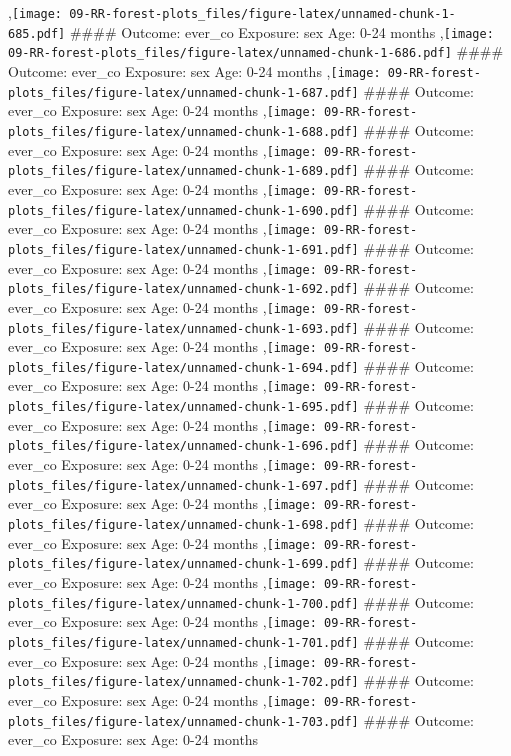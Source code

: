 \documentclass[
  9pt,
]{book}
\begin{document}
,\texttt{[image: 09-RR-forest-plots\_files/figure-latex/unnamed-chunk-1-685.pdf]}
\#\#\#\# Outcome: ever\_co Exposure: sex Age: 0-24 months
,\texttt{[image: 09-RR-forest-plots\_files/figure-latex/unnamed-chunk-1-686.pdf]}
\#\#\#\# Outcome: ever\_co Exposure: sex Age: 0-24 months
,\texttt{[image: 09-RR-forest-plots\_files/figure-latex/unnamed-chunk-1-687.pdf]}
\#\#\#\# Outcome: ever\_co Exposure: sex Age: 0-24 months
,\texttt{[image: 09-RR-forest-plots\_files/figure-latex/unnamed-chunk-1-688.pdf]}
\#\#\#\# Outcome: ever\_co Exposure: sex Age: 0-24 months
,\texttt{[image: 09-RR-forest-plots\_files/figure-latex/unnamed-chunk-1-689.pdf]}
\#\#\#\# Outcome: ever\_co Exposure: sex Age: 0-24 months
,\texttt{[image: 09-RR-forest-plots\_files/figure-latex/unnamed-chunk-1-690.pdf]}
\#\#\#\# Outcome: ever\_co Exposure: sex Age: 0-24 months
,\texttt{[image: 09-RR-forest-plots\_files/figure-latex/unnamed-chunk-1-691.pdf]}
\#\#\#\# Outcome: ever\_co Exposure: sex Age: 0-24 months
,\texttt{[image: 09-RR-forest-plots\_files/figure-latex/unnamed-chunk-1-692.pdf]}
\#\#\#\# Outcome: ever\_co Exposure: sex Age: 0-24 months
,\texttt{[image: 09-RR-forest-plots\_files/figure-latex/unnamed-chunk-1-693.pdf]}
\#\#\#\# Outcome: ever\_co Exposure: sex Age: 0-24 months
,\texttt{[image: 09-RR-forest-plots\_files/figure-latex/unnamed-chunk-1-694.pdf]}
\#\#\#\# Outcome: ever\_co Exposure: sex Age: 0-24 months
,\texttt{[image: 09-RR-forest-plots\_files/figure-latex/unnamed-chunk-1-695.pdf]}
\#\#\#\# Outcome: ever\_co Exposure: sex Age: 0-24 months
,\texttt{[image: 09-RR-forest-plots\_files/figure-latex/unnamed-chunk-1-696.pdf]}
\#\#\#\# Outcome: ever\_co Exposure: sex Age: 0-24 months
,\texttt{[image: 09-RR-forest-plots\_files/figure-latex/unnamed-chunk-1-697.pdf]}
\#\#\#\# Outcome: ever\_co Exposure: sex Age: 0-24 months
,\texttt{[image: 09-RR-forest-plots\_files/figure-latex/unnamed-chunk-1-698.pdf]}
\#\#\#\# Outcome: ever\_co Exposure: sex Age: 0-24 months
,\texttt{[image: 09-RR-forest-plots\_files/figure-latex/unnamed-chunk-1-699.pdf]}
\#\#\#\# Outcome: ever\_co Exposure: sex Age: 0-24 months
,\texttt{[image: 09-RR-forest-plots\_files/figure-latex/unnamed-chunk-1-700.pdf]}
\#\#\#\# Outcome: ever\_co Exposure: sex Age: 0-24 months
,\texttt{[image: 09-RR-forest-plots\_files/figure-latex/unnamed-chunk-1-701.pdf]}
\#\#\#\# Outcome: ever\_co Exposure: sex Age: 0-24 months
,\texttt{[image: 09-RR-forest-plots\_files/figure-latex/unnamed-chunk-1-702.pdf]}
\#\#\#\# Outcome: ever\_co Exposure: sex Age: 0-24 months
,\texttt{[image: 09-RR-forest-plots\_files/figure-latex/unnamed-chunk-1-703.pdf]}
\#\#\#\# Outcome: ever\_co Exposure: sex Age: 0-24 months
\end{document}
